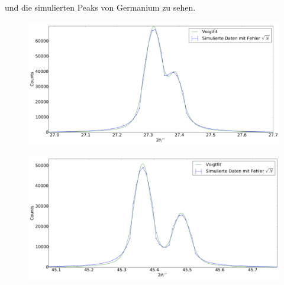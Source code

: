 und die simulierten Peaks von Germanium zu sehen.
\begin{figure}[H]
\begin{minipage}{.5\textwidth}
  \centering
  \includegraphics[scale=0.15]{Simulation_Germaniumpulver_1}
  \label{fig:pul_sim_ger_1}
\end{minipage}
\hspace{0.5cm}
\begin{minipage}{.5\textwidth}
  \centering
  \includegraphics[scale=0.15]{Simulation_Germaniumpulver_2}
  \label{fig:pul_sim_ger_2}
\end{minipage}
\end{figure}
